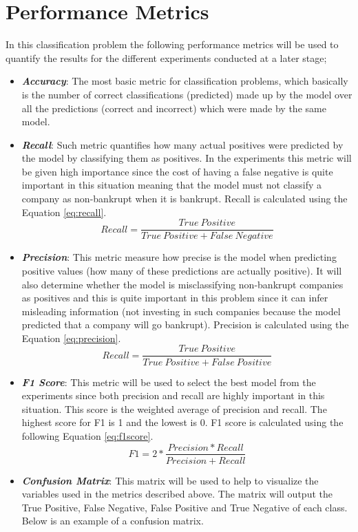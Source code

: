 \section{Performance Metrics}\label{sec:perf_metrics}
In this classification problem the following performance metrics will be used to quantify the results for the different experiments conducted at a later stage;

\begin{itemize}
\itemsep0em
    \item \textbf{\textit{Accuracy}}: The most basic metric for classification problems, which basically is the number of correct classifications (predicted) made up by the model over all the predictions (correct and incorrect) which were made by the same model. \item \textbf{\textit{Recall}}: Such metric quantifies how many actual positives were predicted by the model by classifying them as positives. In the experiments this metric will be given high importance since the cost of having a false negative is quite important in this situation meaning that the model must not classify a company as non-bankrupt when it is bankrupt. Recall is calculated using the Equation \eqref{eq:recall}.
    \begin{equation} 
    \label{eq:recall}
    Recall = \frac{True \ Positive}{True \ Positive + False\ Negative}
    \end{equation}
    \item \textbf{\textit{Precision}}: This metric measure how precise is the model when predicting positive values (how many of these predictions are actually positive). It will also determine whether the model is misclassifying non-bankrupt companies as positives and this is quite important in this problem since it can infer misleading information (not investing in such companies because the model predicted that a company will go bankrupt). Precision is calculated using the Equation \eqref{eq:precision}.
    \begin{equation} 
    \label{eq:precision}
    Recall = \frac{True \ Positive}{True \ Positive + False\ Positive}
    \end{equation}
    \item \textbf{\textit{F1 Score}}: This metric will be used to select the best model from the experiments since both precision and recall are highly important in this situation. This score is the weighted average of precision and recall. The highest score for F1 is 1 and the lowest is 0. F1 score is calculated using the following Equation \eqref{eq:f1score}. 
    \begin{equation} 
    \label{eq:f1score}
    F1 = 2 * \frac{Precision * Recall}{Precision + Recall}
    \end{equation}
    \item \textbf{\textit{Confusion Matrix}}: This matrix will be used to help to visualize the variables used in the metrics described above.  The matrix will output the True Positive, False Negative, False Positive and True Negative of each class. Below is an example of a confusion matrix. 


\end{itemize}
